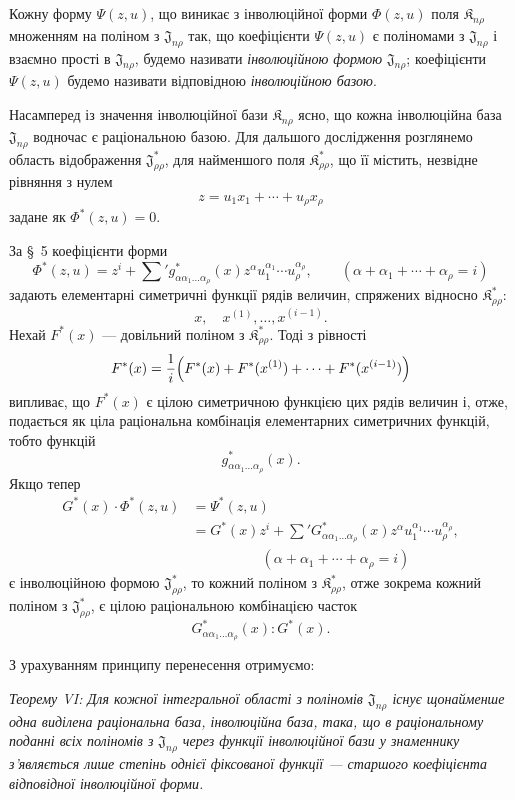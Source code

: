 \documentclass[11pt]{article}
\providecommand{\Kfield}{\mathfrak{K}}
\providecommand{\Jdom}{\mathfrak{J}}
\begin{document}
Кожну форму $\Psi(z,u)$, що виникає з інволюційної форми $\Phi(z,u)$ поля $\Kfield_{n\rho}$ множенням на поліном з $\Jdom_{n\rho}$ так, що коефіцієнти $\Psi(z,u)$ є поліномами з $\Jdom_{n\rho}$ і взаємно прості в $\Jdom_{n\rho}$, будемо називати \emph{інволюційною формою} $\Jdom_{n\rho}$; коефіцієнти $\Psi(z,u)$ будемо називати відповідною \emph{інволюційною базою}.

Насамперед із значення інволюційної бази $\Kfield_{n\rho}$ ясно, що кожна інволюційна база $\Jdom_{n\rho}$ водночас є раціональною базою. Для дальшого дослідження розглянемо область відображення $\Jdom^*_{\rho\rho}$, для найменшого поля $\Kfield^*_{\rho\rho}$, що її містить, незвідне рівняння з нулем
\[
  z=u_1x_1+\cdots+u_\rho x_\rho
\]
задане як $\Phi^*(z,u)=0$.

За \S\ 5 коефіцієнти форми
\[
  \Phi^*(z,u)=z^i+\sum{}' g^*_{\alpha\alpha_1\ldots\alpha_\rho}(x)
  z^\alpha u_1^{\alpha_1}\cdots u_\rho^{\alpha_\rho},
  \qquad
  (\alpha+\alpha_1+\cdots+\alpha_\rho=i)
\]
задають елементарні симетричні функції рядів величин, спряжених відносно $\Kfield^*_{\rho\rho}$:
\[
  x,\quad x^{(1)},\ldots,x^{(i-1)}.
\]
Нехай $F^*(x)$ --- довільний поліном з $\Kfield^*_{\rho\rho}$. Тоді з рівності
\[
  F^*(x)=\frac1i\Bigl(F^*(x)+F^*(x^{(1)})+
  \cdots+F^*(x^{(i-1)})\Bigr)
\]
випливає, що $F^*(x)$ є цілою симетричною функцією цих рядів величин і, отже, подається як ціла раціональна комбінація елементарних симетричних функцій, тобто функцій
\[
  g^*_{\alpha\alpha_1\ldots\alpha_\rho}(x).
\]
Якщо тепер
\[
\begin{aligned}
  G^*(x)\cdot\Phi^*(z,u)
  &=\Psi^*(z,u)\\
  &=G^*(x)z^i+
    \sum{}'G^*_{\alpha\alpha_1\ldots\alpha_\rho}(x)
    z^\alpha u_1^{\alpha_1}\cdots u_\rho^{\alpha_\rho},\\
  &\hspace{5em}(\alpha+\alpha_1+\cdots+\alpha_\rho=i)
\end{aligned}
\]
є інволюційною формою $\Jdom^*_{\rho\rho}$, то кожний поліном з $\Kfield^*_{\rho\rho}$, отже зокрема кожний поліном з $\Jdom^*_{\rho\rho}$, є цілою раціональною комбінацією часток
\[
  G^*_{\alpha\alpha_1\ldots\alpha_\rho}(x):G^*(x).
\]

З урахуванням принципу перенесення отримуємо:

\emph{Теорему VI: Для кожної інтегральної області з поліномів $\Jdom_{n\rho}$ існує щонайменше одна виділена раціональна база, інволюційна база, така, що в раціональному поданні всіх поліномів з $\Jdom_{n\rho}$ через функції інволюційної бази у знаменнику з'являється лише степінь однієї фіксованої функції --- старшого коефіцієнта відповідної інволюційної форми.}
\end{document}
